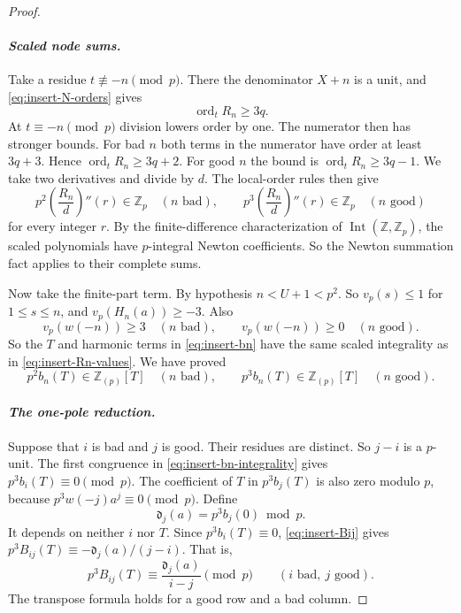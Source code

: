 \begin{proof}
\paragraph{\emph{Scaled node sums.}}
Take a residue $t\not\equiv-n\pmod p$.  There the denominator $X+n$ is a
unit, and \eqref{eq:insert-N-orders} gives
\[
 \operatorname{ord}_tR_n\geq3q.
\]
At $t\equiv-n\pmod p$ division lowers order by one.  The numerator then
has stronger bounds.  For bad $n$ both terms in the numerator have order at
least $3q+3$.  Hence $\operatorname{ord}_tR_n\geq3q+2$.  For good $n$ the
bound is $\operatorname{ord}_tR_n\geq3q-1$.  We take two derivatives and
divide by $d$.  The local-order rules then give
\begin{equation}
 p^2\left(\frac{R_n}{d}\right)''(r)\in\mathbb Z_p
 \quad(n\text{ bad}),
 \qquad
 p^3\left(\frac{R_n}{d}\right)''(r)\in\mathbb Z_p
 \quad(n\text{ good})
 \label{eq:insert-Rn-values}
\end{equation}
for every integer $r$.  By the finite-difference characterization of
$\operatorname{Int}(\mathbb Z,\mathbb Z_p)$, the scaled polynomials have
$p$-integral Newton coefficients.  So the Newton summation fact applies to
their complete sums.

Now take the finite-part term.  By hypothesis $n<U+1<p^2$.  So
$v_p(s)\leq1$ for $1\leq s\leq n$, and
$v_p(H_n(a))\geq-3$.  Also
\begin{equation}
 v_p(w(-n))\geq3\quad(n\text{ bad}),
 \qquad v_p(w(-n))\geq0\quad(n\text{ good}).
 \label{eq:insert-harmonic-bounds}
\end{equation}
So the $T$ and harmonic terms in \eqref{eq:insert-bn} have the same
scaled integrality as in \eqref{eq:insert-Rn-values}.  We have proved
\begin{equation}
 p^2b_n(T)\in\mathbb Z_{(p)}[T]\quad(n\text{ bad}),
 \qquad
 p^3b_n(T)\in\mathbb Z_{(p)}[T]\quad(n\text{ good}).
 \label{eq:insert-bn-integrality}
\end{equation}

\paragraph{\emph{The one-pole reduction.}}
Suppose that $i$ is bad and $j$ is good.  Their residues are distinct.  So
$j-i$ is a $p$-unit.  The first congruence in
\eqref{eq:insert-bn-integrality} gives
$p^3b_i(T)\equiv0\pmod p$.  The coefficient of $T$ in $p^3b_j(T)$ is
also zero modulo $p$, because $p^3w(-j)a^j\equiv0\pmod p$.  Define
\begin{equation}
 \mathfrak d_j(a)=p^3b_j(0)\bmod p.
 \label{eq:insert-Dj}
\end{equation}
It depends on neither $i$ nor $T$.  Since $p^3b_i(T)\equiv0$,
\eqref{eq:insert-Bij} gives $p^3B_{ij}(T)\equiv-\mathfrak d_j(a)/(j-i)$.  That is,
\begin{equation}
 p^3B_{ij}(T)\equiv \frac{\mathfrak d_j(a)}{i-j}\pmod p
 \qquad(i\text{ bad},\ j\text{ good}).
 \label{eq:insert-one-pole}
\end{equation}
The transpose formula holds for a good row and a bad column.


\end{proof}
